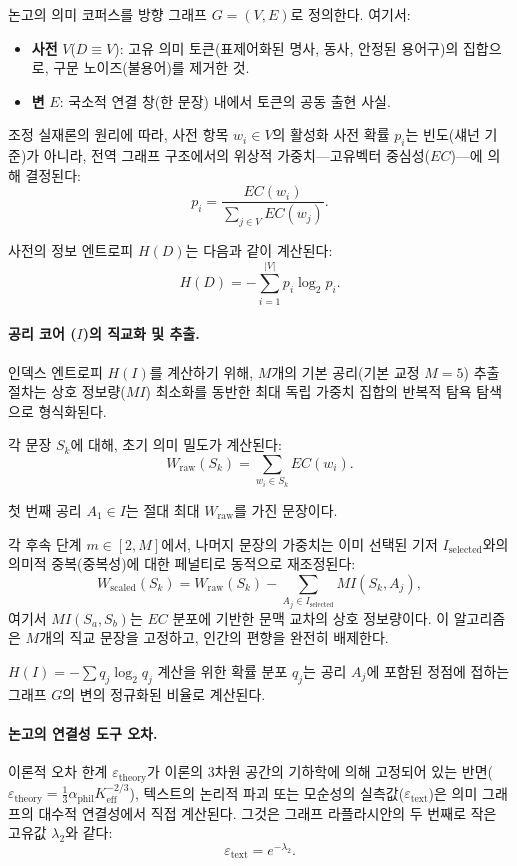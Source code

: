 \documentclass[11pt,a4paper]{article}
\begin{document}
	논고의 의미 코퍼스를 방향 그래프 \(G = (V, E)\)로 정의한다. 여기서:
	\begin{itemize}
		\item \textbf{사전} \(V\)(\(D \equiv V\)): 고유 의미 토큰(표제어화된 명사, 동사, 안정된 용어구)의 집합으로, 구문 노이즈(불용어)를 제거한 것.
		\item \textbf{변} \(E\): 국소적 연결 창(한 문장) 내에서 토큰의 공동 출현 사실.
	\end{itemize}
	
	조정 실재론의 원리에 따라, 사전 항목 \(w_i \in V\)의 활성화 사전 확률 \(p_i\)는 빈도(섀넌 기준)가 아니라, 전역 그래프 구조에서의 위상적 가중치—고유벡터 중심성(\(EC\))—에 의해 결정된다:
	\[
	p_{i} = \frac{EC(w_{i})}{\sum_{j \in V} EC(w_{j})}.
	\]
	
	사전의 정보 엔트로피 \(H(D)\)는 다음과 같이 계산된다:
	\[
	H(D) = -\sum_{i=1}^{|V|} p_{i} \log_{2} p_{i}.
	\]
	
	\paragraph{공리 코어 (\(I\))의 직교화 및 추출.}
	인덱스 엔트로피 \(H(I)\)를 계산하기 위해, \(M\)개의 기본 공리(기본 교정 \(M = 5\)) 추출 절차는 상호 정보량(\(MI\)) 최소화를 동반한 최대 독립 가중치 집합의 반복적 탐욕 탐색으로 형식화된다.
	
	각 문장 \(S_{k}\)에 대해, 초기 의미 밀도가 계산된다:
	\[
	W_{\text{raw}}(S_k) = \sum_{w_i \in S_k} EC(w_i).
	\]
	
	첫 번째 공리 \(A_1 \in I\)는 절대 최대 \(W_{\text{raw}}\)를 가진 문장이다.
	
	각 후속 단계 \(m \in [2, M]\)에서, 나머지 문장의 가중치는 이미 선택된 기저 \(I_{\text{selected}}\)와의 의미적 중복(중복성)에 대한 페널티로 동적으로 재조정된다:
	\[
	W_{\text{scaled}}(S_{k}) = W_{\text{raw}}(S_{k}) - \sum_{A_{j} \in I_{\text{selected}}} MI(S_{k}, A_{j}),
	\]
	여기서 \(MI(S_a, S_b)\)는 \(EC\) 분포에 기반한 문맥 교차의 상호 정보량이다. 이 알고리즘은 \(M\)개의 직교 문장을 고정하고, 인간의 편향을 완전히 배제한다.
	
	\(H(I) = -\sum q_j \log_2 q_j\) 계산을 위한 확률 분포 \(q_{j}\)는 공리 \(A_{j}\)에 포함된 정점에 접하는 그래프 \(G\)의 변의 정규화된 비율로 계산된다.
	
	\paragraph{논고의 연결성 도구 오차.}
	이론적 오차 한계 \(\varepsilon_{\text{theory}}\)가 이론의 3차원 공간의 기하학에 의해 고정되어 있는 반면(\(\varepsilon_{\text{theory}} = \frac{1}{3} \alpha_{\text{phil}} K_{\text{eff}}^{-2/3}\)), 텍스트의 논리적 파괴 또는 모순성의 실측값(\(\varepsilon_{\text{text}}\))은 의미 그래프의 대수적 연결성에서 직접 계산된다. 그것은 그래프 라플라시안의 두 번째로 작은 고유값 \(\lambda_{2}\)와 같다:
	\[
	\varepsilon_{\text{text}} = e^{-\lambda_{2}}.
	\]
	
\end{document}
